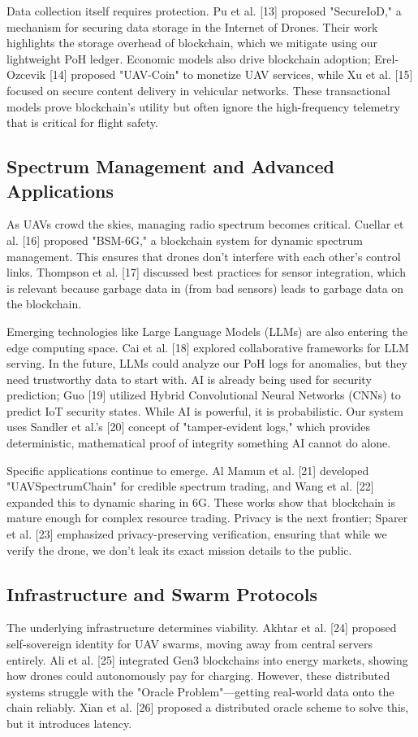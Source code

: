 \documentclass[preprint,12pt]{elsarticle}
\begin{document}
Data collection itself requires protection. Pu et al. [13] proposed "SecureIoD," a mechanism for securing data storage in the Internet of Drones. Their work highlights the storage overhead of blockchain, which we mitigate using our lightweight PoH ledger. Economic models also drive blockchain adoption; Erel-Ozcevik [14] proposed "UAV-Coin" to monetize UAV services, while Xu et al. [15] focused on secure content delivery in vehicular networks. These transactional models prove blockchain's utility but often ignore the high-frequency telemetry that is critical for flight safety.

\subsection{Spectrum Management and Advanced Applications}
\label{subsec2-3}
As UAVs crowd the skies, managing radio spectrum becomes critical. Cuellar et al. [16] proposed "BSM-6G," a blockchain system for dynamic spectrum management. This ensures that drones don't interfere with each other's control links. Thompson et al. [17] discussed best practices for sensor integration, which is relevant because garbage data in (from bad sensors) leads to garbage data on the blockchain.


Emerging technologies like Large Language Models (LLMs) are also entering the edge computing space. Cai et al. [18] explored collaborative frameworks for LLM serving. In the future, LLMs could analyze our PoH logs for anomalies, but they need trustworthy data to start with. AI is already being used for security prediction; Guo [19] utilized Hybrid Convolutional Neural Networks (CNNs) to predict IoT security states. While AI is powerful, it is probabilistic. Our system uses Sandler et al.'s [20] concept of "tamper-evident logs," which provides deterministic, mathematical proof of integrity something AI cannot do alone.


Specific applications continue to emerge. Al Mamun et al. [21] developed "UAVSpectrumChain" for credible spectrum trading, and Wang et al. [22] expanded this to dynamic sharing in 6G. These works show that blockchain is mature enough for complex resource trading. Privacy is the next frontier; Sparer et al. [23] emphasized privacy-preserving verification, ensuring that while we verify the drone, we don't leak its exact mission details to the public.
\subsection{Infrastructure and Swarm Protocols}
\label{subsec2-4}
The underlying infrastructure determines viability. Akhtar et al. [24] proposed self-sovereign identity for UAV swarms, moving away from central servers entirely. Ali et al. [25] integrated Gen3 blockchains into energy markets, showing how drones could autonomously pay for charging. However, these distributed systems struggle with the "Oracle Problem"—getting real-world data onto the chain reliably. Xian et al. [26] proposed a distributed oracle scheme to solve this, but it introduces latency.
\end{document}
